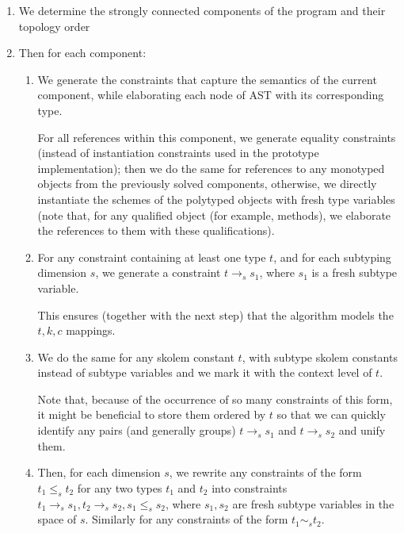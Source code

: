 \begin{enumerate}
    \item We determine the strongly connected components of the program and their topology order 

    \item Then for each component:

    \begin{enumerate}
        \item We generate the constraints that capture the semantics of the current component, while elaborating each node of AST with its corresponding type.

        For all references within this component, we generate equality constraints (instead of instantiation constraints used in the prototype implementation); then we do the same for references to any monotyped objects from the previously solved components, otherwise, we directly instantiate the schemes of the polytyped objects with fresh type variables (note that, for any qualified object (for example, methods), we elaborate the references to them with these qualifications).

        \item For any constraint containing at least one type $t$, and for each subtyping dimension $s$, we generate a constraint $t \to_s s_1$, where $s_1$ is a fresh subtype variable.

        This ensures (together with the next step) that the algorithm models the $t, k, c$ mappings.

        \item We do the same for any skolem constant $t$, with subtype skolem constants instead of subtype variables and we mark it with the context level of $t$. \label{gen_subskolem}

        Note that, because of the occurrence of so many constraints of this form, it might be beneficial to store them ordered by $t$ so that we can quickly identify any pairs (and generally groups) $t \to_s s_1$ and $t \to_s s_2$ and unify them. \label{mapping_once}


        \item Then, for each dimension $s$, we rewrite any constraints of the form $t_1 \leq_s t_2$ for any two types $t_1$ and $t_2$ into constraints $t_1 \to_s s_1, t_2 \to_s s_2, s_1 \leq_s s_2$, where $s_1, s_2$ are fresh subtype variables in the space of $s$. Similarly for any constraints of the form $t_1 \sim_s t_2$.


\end{enumerate}
\end{enumerate}
